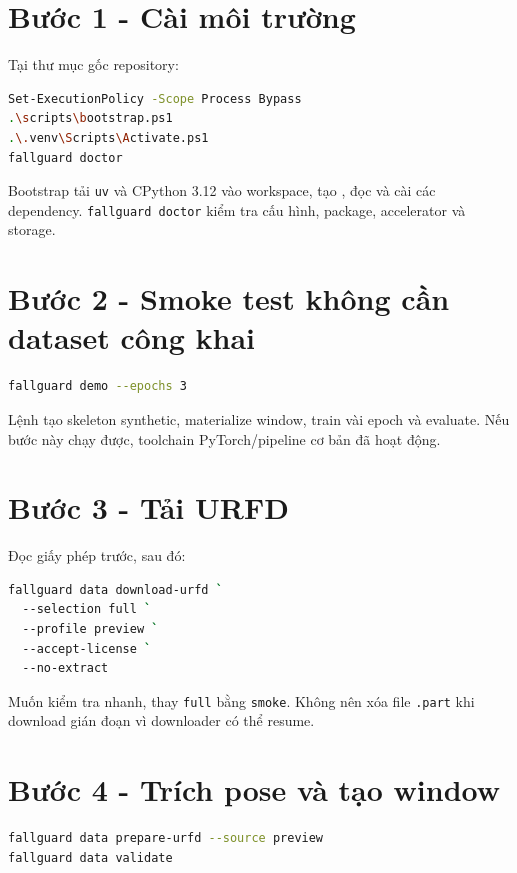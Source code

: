 \documentclass[12pt,a4paper,oneside]{report}
\newcommand{\code}[1]{\texttt{#1}}
\newcommand{\pathcode}[1]{\texttt{\detokenize{#1}}}
\begin{document}
\section{Bước 1 - Cài môi trường}

Tại thư mục gốc repository:

\begin{lstlisting}[language=bash]
Set-ExecutionPolicy -Scope Process Bypass
.\scripts\bootstrap.ps1
.\.venv\Scripts\Activate.ps1
fallguard doctor
\end{lstlisting}

Bootstrap tải \code{uv} và CPython 3.12 vào workspace, tạo \pathcode{.venv}, đọc
\pathcode{uv.lock} và cài các dependency. \code{fallguard doctor} kiểm tra cấu
hình, package, accelerator và storage.

\section{Bước 2 - Smoke test không cần dataset công khai}

\begin{lstlisting}[language=bash]
fallguard demo --epochs 3
\end{lstlisting}

Lệnh tạo skeleton synthetic, materialize window, train vài epoch và evaluate.
Nếu bước này chạy được, toolchain PyTorch/pipeline cơ bản đã hoạt động.

\section{Bước 3 - Tải URFD}

Đọc giấy phép trước, sau đó:

\begin{lstlisting}[language=bash]
fallguard data download-urfd `
  --selection full `
  --profile preview `
  --accept-license `
  --no-extract
\end{lstlisting}

Muốn kiểm tra nhanh, thay \code{full} bằng \code{smoke}. Không nên xóa file
\code{.part} khi download gián đoạn vì downloader có thể resume.

\section{Bước 4 - Trích pose và tạo window}

\begin{lstlisting}[language=bash]
fallguard data prepare-urfd --source preview
fallguard data validate
\end{lstlisting}
\end{document}
